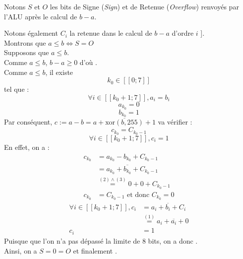 \documentclass[twoside, 12pt, a4paper]{article}
\begin{document}
        Notons $S$ et $O$ les bits de Signe (\textit{Sign}) et de Retenue (\textit{Overflow}) renvoyés par l'ALU après le calcul de $b-a$.

        Notons également $C_i$ la retenue dans le calcul de $b-a$ d'ordre $i$ \in [\![ 0 ; 7 ]\!]. \\

        \hspace{-\baselineskip}Montrons que $a \leq b \iff S = O$ \\
        \framebox[1cm][c]{$\implies$} Supposons que $a \leq b$. \\
            Comme $a \leq b$, $b-a \geq 0$ d'où . \\
            Comme $a \leq b$, il existe \[ k_0 \in [\![ 0 ; 7 ]\!] \] tel que : 
                \begin{equation}
                    \forall i \in [\![k_0+1 ; 7]\!], a_i = b_i
                \end{equation}
                \begin{equation}
                    a_{k_0} = 0
                \end{equation}
                \begin{equation}
                    b_{k_0} = 1
                \end{equation}
                Par conséquent, $c := a-b = a + \overline{\text{xor}(b, 255)} + 1$ va vérifier :
                \begin{equation*}
                    c_{k_0} = C_{k_0-1}
                \end{equation*}
                \begin{equation*}
                    \forall i \in [\![k_0+1 ; 7]\!], c_i = 1
                \end{equation*}
                En effet, on a :
                \begin{align*}
                    c_{k_0} &= a_{k_0} - b_{k_0} + C_{k_0-1} 
                    \\ &= a_{k_0} + \overline{b_{k_0}} + C_{k_0-1} 
                    \\ &\overset{(2) \land (3)}{=} 0 + 0 + C_{k_0-1} 
                    \\ c_{k_0} &= C_{k_0-1} \text{ et donc } C_{k_0} = 0
                    \end{align*}
                    \begin{align*}
                    \forall i \in [\![k_0+1 ; 7]\!], c_i &= a_i + \overline{b_i} + C_i \
                    \\ &\overset{(1)}{=} a_i + \overline{a_i} + 0 
                    \\ c_i &= 1
                    \end{align*}
                Puisque que l'on n'a pas dépassé la limite de 8 bits, on a donc . \\     
            Ainsi, on a $S = 0 = O$ et finalement \framebox[1.5cm][c]{$S = O$}. \\
\end{document}

